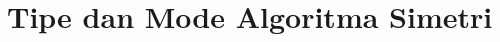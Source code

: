 \documentclass[../main.tex]{subfiles}
\begin{document}
\chapter{Tipe dan Mode Algoritma Simetri}
\end{document}
